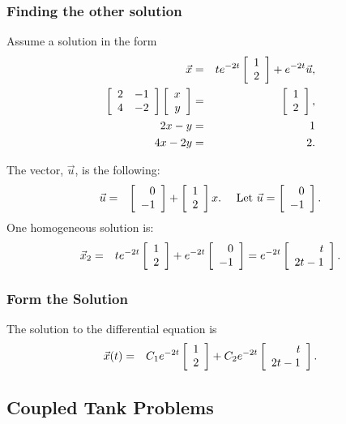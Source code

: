 \begin{frame}
  \frametitle{Finding the other solution}

  Assume a solution in the form
  \begin{eqnarray*}
    \vec{x} & = & t e^{-2 t} \left[ \begin{array}{r} 1 \\ 2 \end{array} \right] + e^{-2 t} \vec{u}, \\
    \left[ \begin{array}{rr} 2 & -1 \\ 4 & -2 \end{array} \right] \left[ \begin{array}{r} x \\ y \end{array} \right] & = & \left[ \begin{array}{r} 1 \\ 2 \end{array} \right], \\
    2x-y & = & 1 \\
    4x-2y & = & 2.
  \end{eqnarray*}

  The vector, $\vec{u}$, is the following:
  \begin{eqnarray*}
    \vec{u} & = & \left[ \begin{array}{r} 0 \\ -1 \end{array} \right]+\left[ \begin{array}{r} 1 \\ 2 \end{array} \right]x. 
  ~~~~\text{Let }  \vec{u}  =  \left[ \begin{array}{r} 0 \\ -1 \end{array} \right].
  \end{eqnarray*}
  One homogeneous solution is:
  \begin{eqnarray*}
    \vec{x}_2 & = & te^{-2t}\left[ \begin{array}{r} 1 \\ 2 \end{array} \right]+e^{-2t}\left[ \begin{array}{r} 0 \\ -1 \end{array} \right] 
     =  e^{-2t}\left[ \begin{array}{r} t \\ 2t-1 \end{array} \right].
  \end{eqnarray*}

\end{frame}

\begin{frame}
  \frametitle{Form the Solution}
  
  The solution to the differential equation is
  \begin{eqnarray*}
    \vec{x}(t) & = &  C_1 e^{-2t} \left[ \begin{array}{r} 1 \\ 2 \end{array} \right] + C_2 e^{-2t}\left[ \begin{array}{r} t \\ 2t-1 \end{array} \right].
  \end{eqnarray*}
\end{frame}


\subsection{Coupled Tank Problems}


